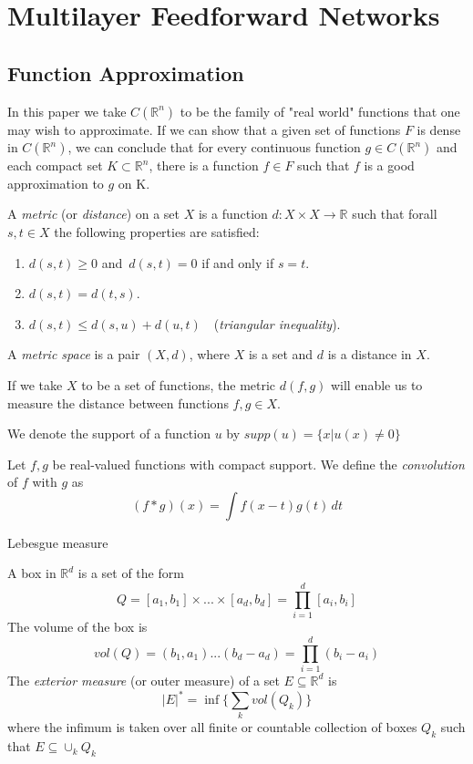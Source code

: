 \documentclass[../main.tex]{subfiles}
\begin{document}
\chapter{Multilayer Feedforward Networks} \label{ch:methods}
\section{Function Approximation}
\noindent In this paper we take $C(\mathbb{R}^n)$ to be the family of "real world" functions that one may wish to approximate. If we can show that a given set of functions $F$ is dense in $C(\mathbb{R}^n)$, we can conclude that for every continuous function $g \in C(\mathbb{R}^n) $ and each compact set $K \subset \mathbb{R}^n$, there is a function $f \in F$ such that $f$ is a good approximation to $g$ on K. 

\begin{definition}\label{thm:first}
	A \emph{metric} (or \emph{distance}) on a set $X$ is a function $d:X\times X\rightarrow \mathbb{R} $ such that forall $s,t\in X$ the following properties are satisfied:
	\begin{enumerate}
		\item $d(s,t) \geq 0$ and $ \, d(s,t)=0$ if and only if $ s=t$.
		\item $d(s,t)=d(t,s)$.
		\item $d(s,t)\leq d(s,u)+d(u,t)\quad$(\emph{triangular inequality}).
	\end{enumerate}
A \emph{metric space} is a pair $(X,d)$, where $X$ is a set and $d$ is a distance in $X$.
\end{definition}
\noindent  If we take $X$ to be a set of functions, the metric $d(f,g)$ will enable us to measure the distance between functions $f,g \in X$.

\begin{definition}
We denote the support of a function $u$ by $supp(u)= \{x | u(x)\neq 0\}$
\end{definition}

\begin{definition}
	Let $f,g$ be real-valued functions with compact support. We define the \emph{convolution} of $f$ with $g$ as $$(f\ast g)(x)=\int f(x-t)g(t) \, dt$$
\end{definition}

\noindent Lebesgue measure

\begin{definition} A box in $\mathbb{R}^d$ is a set of the form 
	$$ Q = [a_1,b_1]  \times ... \times [a_d,b_d] = \prod_{i=1}^d [a_i,b_i]$$
	The volume of the box is $$ vol(Q)= (b_1,a_1) ... (b_d-a_d)= \prod_{i=1}^d (b_i-a_i)$$
	The \emph{exterior measure} (or outer measure) of a set $E\subseteq \mathbb{R}^d$ is $$ |E|^* = \inf\{\sum_k vol(Q_k)\} $$ 
	where the infimum is taken over all finite or countable collection of boxes $Q_k$ such that $E \subseteq \cup_k Q_k$
\end{definition}
\end{document}
